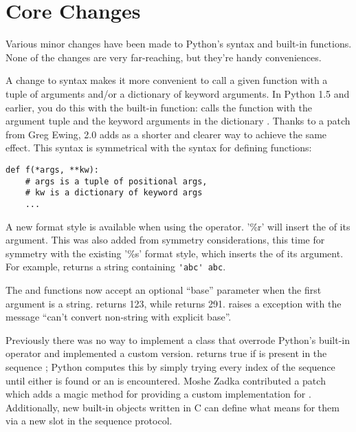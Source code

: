\documentclass{howto}
\begin{document}
\section{Core Changes}

Various minor changes have been made to Python's syntax and built-in
functions.  None of the changes are very far-reaching, but they're
handy conveniences.

A change to syntax makes it more convenient to call a given function
with a tuple of arguments and/or a dictionary of keyword arguments.
In Python 1.5 and earlier, you do this with the 
built-in function:  calls the
function  with the argument tuple  and the
keyword arguments in the dictionary .  Thanks to a patch from
Greg Ewing, 2.0 adds  as a shorter
and clearer way to achieve the same effect.  This syntax is
symmetrical with the syntax for defining functions:

\begin{verbatim}
def f(*args, **kw):
    # args is a tuple of positional args,
    # kw is a dictionary of keyword args
    ...
\end{verbatim}

A new format style is available when using the \code{\%} operator.
'\%r' will insert the  of its argument.  This was
also added from symmetry considerations, this time for symmetry with
the existing '\%s' format style, which inserts the  of
its argument.  For example,  returns a
string containing \verb|'abc' abc|.

The  and  functions now accept an
optional ``base'' parameter when the first argument is a string.
 returns 123, while  returns
291.   raises a  exception
with the message ``can't convert non-string with explicit base''.

Previously there was no way to implement a class that overrode
Python's built-in  operator and implemented a custom
version.   returns true if  is
present in the sequence ; Python computes this by simply
trying every index of the sequence until either  is found or
an  is encountered.  Moshe Zadka contributed a
patch which adds a  magic method for providing a
custom implementation for . Additionally, new built-in
objects written in C can define what  means for them via a
new slot in the sequence protocol.
\end{document}
